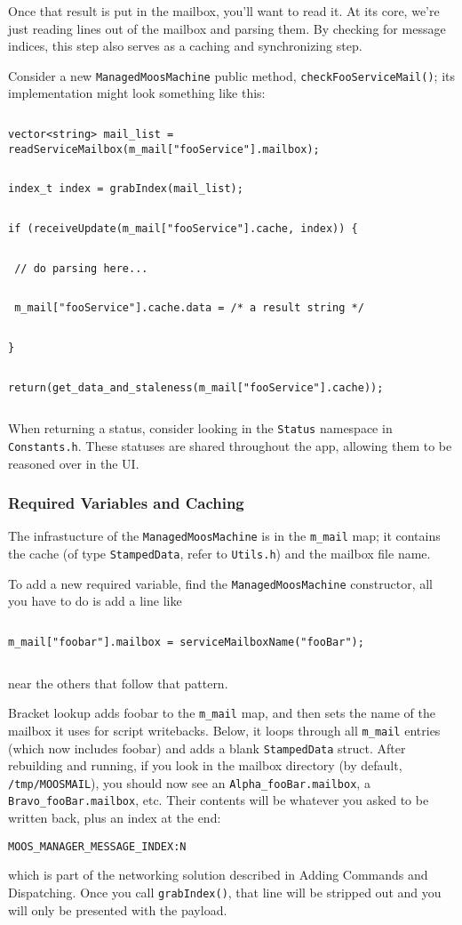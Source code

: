 \documentclass[11pt]{article}
\newcommand{\cmdline}[1]{\vspace{.2em} $\:$\\ \begin{minipage}{\dimexpr\textwidth-2cm}
\texttt{#1}
\end{minipage} $\:$\\ \vspace{-.2em} }
\begin{document}
Once that result is put in the mailbox, you'll want to read it. At its core, we're just reading lines out of the mailbox and parsing them. By checking for message indices, this step also serves as a caching and synchronizing step.

Consider a new \texttt{ManagedMoosMachine} public method, \texttt{checkFooServiceMail()}; its implementation might look something like this:

\cmdline{vector<string> mail\_list = readServiceMailbox(m\_mail["fooService"].mailbox);}
\cmdline{index\_t index = grabIndex(mail\_list);}
\cmdline{if (receiveUpdate(m\_mail["fooService"].cache, index)) \{}
\cmdline{	// do parsing here...}
\cmdline{	m\_mail["fooService"].cache.data = /* a result string */}
\cmdline{\}}
\cmdline{return(get\_data\_and\_staleness(m\_mail["fooService"].cache));}

When returning a status, consider looking in the \texttt{Status} namespace in \texttt{Constants.h}. These statuses are shared throughout the app, allowing them to be reasoned over in the UI. 

\subsubsection{Required Variables and Caching}
The infrastucture of the \texttt{ManagedMoosMachine} is in the \texttt{m\_mail} map; it contains the cache (of type \texttt{StampedData}, refer to \texttt{Utils.h}) and the mailbox file name.

To add a new required variable, find the \texttt{ManagedMoosMachine} constructor, all you have to do is add a line like

\cmdline{m\_mail["foobar"].mailbox = serviceMailboxName("fooBar");}

near the others that follow that pattern.

Bracket lookup adds foobar to the \texttt{m\_mail} map, and then sets the name of the mailbox it uses for script writebacks. Below, it loops through all \texttt{m\_mail} entries (which now includes foobar) and adds a blank \texttt{StampedData} struct. After rebuilding and running, if you look in the mailbox directory (by default, \texttt{/tmp/MOOSMAIL}), you should now see an \texttt{Alpha\_fooBar.mailbox}, a \texttt{Bravo\_fooBar.mailbox}, etc. Their contents will be whatever you asked to be written back, plus an index at the end:
\cmdline{MOOS\_MANAGER\_MESSAGE\_INDEX:N}
which is part of the networking solution described in Adding Commands and Dispatching. Once you call \texttt{grabIndex()}, that line will be stripped out and you will only be presented with the payload.
\end{document}
